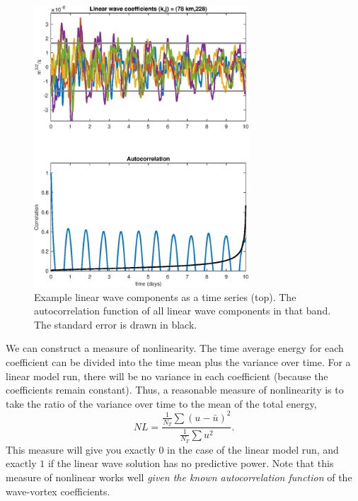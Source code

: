 \documentclass[10pt]{article}
\begin{document}
\begin{figure}[t]
  \centerline{\includegraphics[width=19pc,angle=0]{figures/Autocorrelation_k_12_j_228}}
  \caption{Example linear wave components as a time series (top). The autocorrelation function of all linear wave components in that band. The standard error is drawn in black.}
  \label{Autocorrelation_k_12_j_228}
\end{figure}

We can construct a measure of nonlinearity. The time average energy for each coefficient can be divided into the time mean plus the variance over time. For a linear model run, there will be no variance in each coefficient (because the coefficients remain constant). Thus, a reasonable measure of nonlinearity is to take the ratio of the variance over time to the mean of the total energy,
\begin{equation}
    NL = \frac{\frac{1}{N_T}\sum \left( u -  \bar{u} \right)^2}{\frac{1}{N_T}\sum u^2}.
\end{equation}
This measure will give you exactly $0$ in the case of the linear model run, and exactly $1$ if the linear wave solution has no predictive power. Note that this measure of nonlinear works well \emph{given the known autocorrelation function} of the wave-vortex coefficients.
\end{document}
